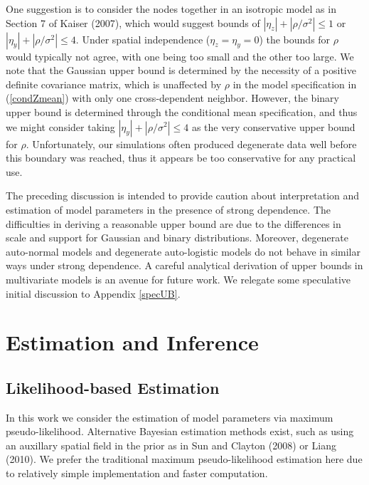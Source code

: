 \documentclass[12pt, a4paper, twoside]{article}
\begin{document}
One suggestion is to consider the nodes together in an isotropic model as in Section 7 of Kaiser (2007), which would suggest bounds of $|\eta_z| + |\rho/\sigma^2| \leq 1$ or $|\eta_y| + |\rho/\sigma^2| \leq 4$. Under spatial independence ($\eta_z=\eta_y=0$) the bounds for $\rho$ would typically not agree, with one being too small and the other too large. We note that the Gaussian upper bound is determined by the necessity of a positive definite covariance matrix, which is unaffected by $\rho$ in the model specification in (\ref{condZmean}) with only one cross-dependent neighbor. However, the binary upper bound is determined through the conditional mean specification, and thus we might consider taking $|\eta_y| + |\rho/\sigma^2| \leq 4$ as the very conservative upper bound for $\rho$. Unfortunately, our simulations often produced degenerate data well before this boundary was reached, thus it appears be too conservative for any practical use. 

The preceding discussion is intended to provide caution about interpretation and estimation of model parameters in the presence of strong dependence. The difficulties in deriving a reasonable upper bound are due to the differences in scale and support for Gaussian and binary distributions. Moreover, degenerate auto-normal models and degenerate auto-logistic models do not behave in similar ways under strong dependence. A careful analytical derivation of upper bounds in multivariate models is an avenue for future work. We relegate some speculative initial discussion to Appendix \ref{specUB}. %

\section{Estimation and Inference} \label{EstimInf}
\subsection{Likelihood-based Estimation} \label{MLEest}
In this work we consider the estimation of model parameters via maximum pseudo-likelihood. Alternative Bayesian estimation methods exist, such as using an auxillary spatial field in the prior as in Sun and Clayton (2008) or Liang (2010). We prefer the traditional maximum pseudo-likelihood estimation here due to relatively simple implementation and faster computation.
\end{document}
